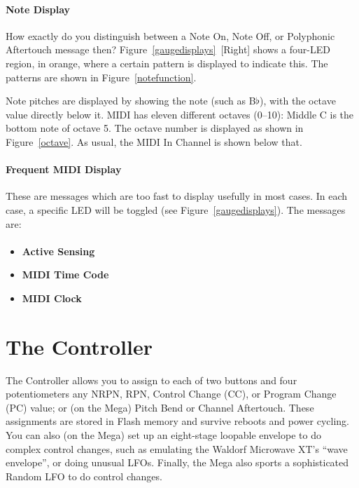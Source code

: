 \documentclass{article}
\begin{document}
\paragraph{Note Display}


How exactly do you distinguish between a Note On, Note Off, or Polyphonic Aftertouch message then?  Figure~{\ref{gaugedisplays}}~[Right] shows a four-LED region, in orange, where a certain pattern is displayed to indicate this.  The patterns are shown in Figure~\ref{notefunction}.

Note pitches are displayed by showing the note (such as B$\flat$), with the octave value directly below it.  MIDI has eleven different octaves (0--10): Middle C is the bottom note of octave 5.  The octave number is displayed as shown in Figure~\ref{octave}.  As usual, the MIDI In Channel is shown below that.


\paragraph{Frequent MIDI Display}  These are messages which are too fast to display usefully in most cases.  In each case, a specific LED will be toggled (see Figure~\ref{gaugedisplays}).  The messages are:

\paragraph{}\vspace{-2em}\begin{itemize}
\item {\bf Active Sensing}
\item {\bf MIDI Time Code}
\item {\bf MIDI Clock}
\end{itemize}


\clearpage
\section {The Controller}
\label{controller}

The Controller allows you to assign to each of two buttons and four potentiometers any NRPN, RPN, Control Change (CC), or Program Change (PC) value; or (on the Mega) Pitch Bend or Channel Aftertouch.%
These assignments are stored in Flash memory and survive reboots and power cycling.  You can also (on the Mega) set up an eight-stage loopable envelope to do complex control changes, such as emulating the Waldorf Microwave XT's ``wave envelope'', or doing unusual LFOs.  Finally, the Mega also sports a sophisticated Random LFO to do control changes.
\end{document}
